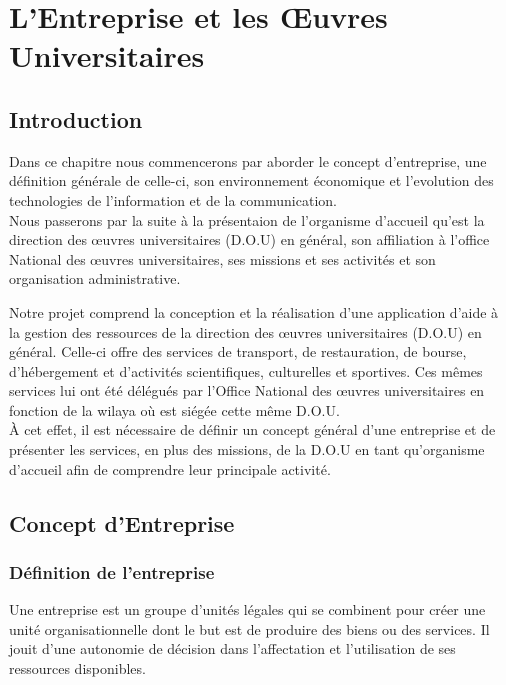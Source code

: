 \chapter{L'Entreprise et les Œuvres Universitaires}

\section{Introduction}
Dans ce chapitre nous commencerons par aborder le concept d'entreprise, une définition générale de celle-ci, son environnement économique et l'evolution des technologies de l'information et de la communication.\\

Nous passerons par la suite à la présentaion de l'organisme d'accueil qu'est la direction des œuvres universitaires (D.O.U) en général, son affiliation à l'office National des œuvres universitaires, ses missions et ses activités et son organisation administrative. 


Notre projet comprend la conception et la réalisation d'une application d'aide à la gestion des ressources de la direction des œuvres universitaires (D.O.U) en général. Celle-ci offre des services de transport, de restauration, de bourse, d'hébergement et d'activités scientifiques, culturelles et sportives. Ces mêmes services lui ont été délégués par l'Office National des œuvres universitaires en fonction de la wilaya où est siégée cette même \acs{D.O.U}.\\

À cet effet, il est nécessaire de définir un concept général d'une entreprise et de  présenter les services, en plus des missions, de la \acs{D.O.U} en tant qu'organisme d'accueil afin de comprendre leur principale activité.\\

\section{Concept d’Entreprise}
\subsection{Définition de l’entreprise }
Une entreprise\cite{def-entreprise} est un groupe d'unités légales qui se combinent pour créer une unité organisationnelle dont le but est de produire des biens ou des services. Il jouit d'une autonomie de décision dans l'affectation et l'utilisation de ses ressources disponibles.\\

